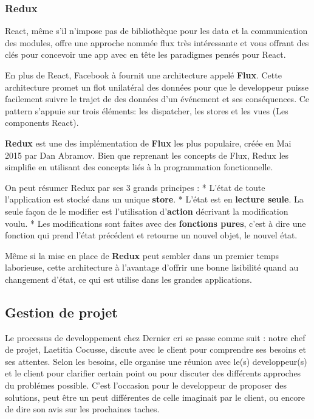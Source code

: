 \bigskip

\subsubsection{Redux}\label{redux}

React, même s'il n'impose pas de bibliothèque pour les data et la
communication des modules, offre une approche nommée flux très
intéressante et vous offrant des clés pour concevoir une app avec en
tête les paradigmes pensés pour React.

En plus de React, Facebook à fournit une architecture appelé
\textbf{Flux}. Cette architecture promet un flot unilatéral des données
pour que le developpeur puisse facilement suivre le trajet de des
données d'un événement et ses conséquences. Ce pattern s'appuie sur
trois éléments: les dispatcher, les stores et les vues (Les components
React).

\textbf{Redux} est une des implémentation de \textbf{Flux} les plus
populaire, créée en Mai 2015 par Dan Abramov. Bien que reprenant les
concepts de Flux, Redux les simplifie en utilisant des concepts liés à
la programmation fonctionnelle.

On peut résumer Redux par ses 3 grands principes : * L'état de toute
l'application est stocké dans un unique \textbf{store}. * L'état est en
\textbf{lecture seule}. La seule façon de le modifier est l'utilisation
d'\textbf{action} décrivant la modification voulu. * Les modifications
sont faites avec des \textbf{fonctions pures}, c'est à dire une fonction
qui prend l'état précédent et retourne un nouvel objet, le nouvel état.

Même si la mise en place de \textbf{Redux} peut sembler dans un premier
temps laborieuse, cette architecture à l'avantage d'offrir une bonne
lisibilité quand au changement d'état, ce qui est utilise dans les
grandes applications.

\subsection{Gestion de projet}\label{gestion-de-projet}

Le processus de developpement chez Dernier cri se passe comme suit :
notre chef de projet, Laetitia Cocusse, discute avec le client pour
comprendre ses besoins et ses attentes. Selon les besoins, elle organise
une réunion avec le(s) developpeur(s) et le client pour clarifier
certain point ou pour discuter des différents approches du problémes
possible. C'est l'occasion pour le developpeur de proposer des
solutions, peut être un peut différentes de celle imaginait par le
client, ou encore de dire son avis sur les prochaines taches.

